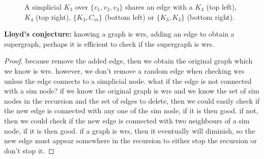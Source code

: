 \begin{figure}[H]
\centering
{}
\caption{A simplicial $K_3$ over $\{v_1,v_2,v_3\}$ shares an edge with a $K_3$ (top left), $K_4$ (top right), $\{K_3, C_m\}$ (bottom left) or $\{K_3,K_3\}$ (bottom right).}
\label{fg:k3+}
\end{figure} 

\textbf{Lloyd's conjecture:} knowing a graph is wrs, adding an edge to obtain a supergraph, perhaps it is efficient to check if the supergraph is wrs.

\begin{proof}
because remove the added edge, then we obtain the original graph which we know is wrs. however, we don't remove a random edge when checking wrs unless the edge connects to a simplicial node. what if the edge is not connected with a sim node? if we know the original graph is wrs and we know the set of sim nodes in the recursion and the set of edges to delete, then we could easily check if the new edge is connected with any one of the sim node, if it is then good. if not, then we could check if the new edge is connected with two neighbours of a sim node, if it is then good. if a graph is wrs, then it eventually will diminish, so the new edge must appear somewhere in the recursion to either stop the recursion or don't stop it.
\end{proof} 

